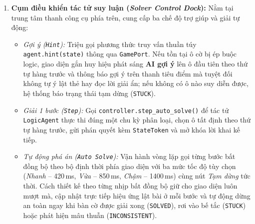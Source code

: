 \begin{enumerate}
    \item \textbf{Cụm điều khiển tác tử suy luận (\emph{Solver Control Dock}):} Nằm tại trung tâm thanh công cụ phía trên, cung cấp ba chế độ trợ giúp và giải tự động:
    \begin{itemize}
        \item \emph{Gợi ý (\texttt{Hint}):} Triệu gọi phương thức truy vấn thuần túy \texttt{agent.hint(state)} thông qua \texttt{GamePort}. Nếu tồn tại ô cờ bị ép buộc logic, giao diện gắn huy hiệu phát sáng \textbf{AI gợi ý} lên ô đầu tiên theo thứ tự hàng trước và thông báo gợi ý trên thanh tiêu điểm mà tuyệt đối không tự ý lật thẻ hay đọc lời giải ẩn; nếu không có ô nào suy diễn được, hệ thống báo trạng thái tạm dừng (\texttt{STUCK}).
        \item \emph{Giải 1 bước (\texttt{Step}):} Gọi \texttt{controller.step\_auto\_solve()} để tác tử \texttt{LogicAgent} thực thi đúng một chu kỳ phân loại, chọn ô tất định theo thứ tự hàng trước, gửi phán quyết kèm \texttt{StateToken} và mở khóa lời khai kế tiếp.
        \item \emph{Tự động phá án (\texttt{Auto Solve}):} Vận hành vòng lặp gọi từng bước bất đồng bộ theo bộ định thời phía giao diện với ba mức tốc độ tùy chọn (\emph{Nhanh} -- 420\,ms, \emph{Vừa} -- 850\,ms, \emph{Chậm} -- 1400\,ms) cùng nút \emph{Tạm dừng} tức thời. Cách thiết kế theo từng nhịp bất đồng bộ giữ cho giao diện luôn mượt mà, cập nhật trực tiếp hiệu ứng lật bài ở mỗi bước và tự động dừng an toàn ngay khi bàn cờ được giải xong (\texttt{SOLVED}), rơi vào bế tắc (\texttt{STUCK}) hoặc phát hiện mâu thuẫn (\texttt{INCONSISTENT}).
    \end{itemize}


\end{enumerate}
